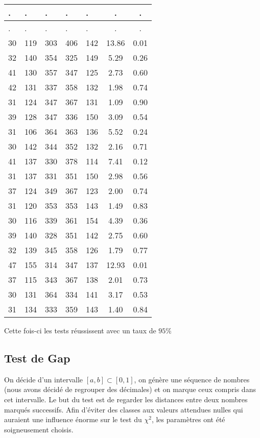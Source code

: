 \documentclass[12pt,a4paper]{article}
\begin{document}
\begin{center}
\begin{tabular}{|l|l|l|l|l|c|c|}
 . & . & . & . & . & . & . \\ \hline
 . & . & . & . & . & . & . \\ \hline
30 & 119 & 303 & 406 & 142 & 13.86 &  0.01\\ \hline
32 & 140 & 354 & 325 & 149 &  5.29 &  0.26\\ \hline
41 & 130 & 357 & 347 & 125 &  2.73 &  0.60\\ \hline
42 & 131 & 337 & 358 & 132 &  1.98 &  0.74\\ \hline
31 & 124 & 347 & 367 & 131 &  1.09 &  0.90\\ \hline
39 & 128 & 347 & 336 & 150 &  3.09 &  0.54\\ \hline
31 & 106 & 364 & 363 & 136 &  5.52 &  0.24\\ \hline
30 & 142 & 344 & 352 & 132 &  2.16 &  0.71\\ \hline
41 & 137 & 330 & 378 & 114 &  7.41 &  0.12\\ \hline
31 & 137 & 331 & 351 & 150 &  2.98 &  0.56\\ \hline
37 & 124 & 349 & 367 & 123 &  2.00 &  0.74\\ \hline
31 & 120 & 353 & 353 & 143 &  1.49 &  0.83\\ \hline
30 & 116 & 339 & 361 & 154 &  4.39 &  0.36\\ \hline
39 & 140 & 328 & 351 & 142 &  2.75 &  0.60\\ \hline
32 & 139 & 345 & 358 & 126 &  1.79 &  0.77\\ \hline
47 & 155 & 314 & 347 & 137 & 12.93 &  0.01\\ \hline
37 & 115 & 343 & 367 & 138 &  2.01 &  0.73\\ \hline
30 & 131 & 364 & 334 & 141 &  3.17 &  0.53\\ \hline
31 & 134 & 333 & 359 & 143 &  1.40 &  0.84\\ \hline
\end{tabular}
\end{center}

Cette fois-ci les tests réussissent avec un taux de $95\%$


\subsection{Test de Gap}
On décide d'un intervalle $[a,b] \subset [0,1]$,
on génère une séquence de nombres (nous avons décidé de regrouper des décimales)
et on marque ceux compris dans cet intervalle. Le but du test est de regarder les
distances entre deux nombres marqués successifs.
Afin d'éviter des classes aux valeurs attendues nulles
qui auraient une influence énorme sur le test du $\chi^2$,
les paramètres ont été soigneusement choisis.
\end{document}
